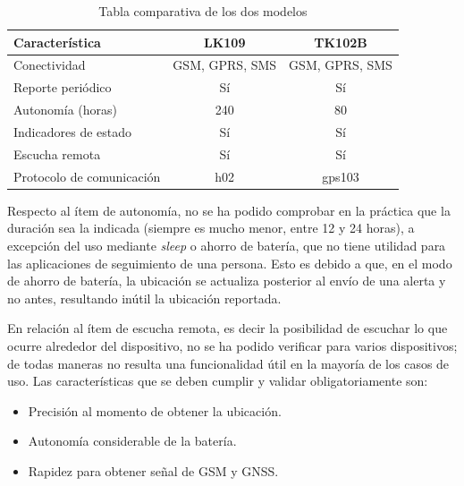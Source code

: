 \begin{table}[H]
	\centering
	\caption[Tabla comparativa]{Tabla comparativa de los dos modelos}
	\begin{tabular}{l c c}    
		\toprule
		\textbf{Característica} 	 & \textbf{LK109} & \textbf{TK102B}	  \\
		\midrule
		Conectividad & GSM, GPRS, SMS & 	GSM, GPRS, SMS			\\		
		Reporte periódico & Sí & Sí			\\
		Autonomía (horas) & 240 & 80		\\
		Indicadores de estado & Sí & Sí \\
		Escucha remota & Sí & Sí \\
		Protocolo de comunicación & h02 & gps103 \\
		\bottomrule
		\hline
	\end{tabular}
	\label{tab:peces}
\end{table}

Respecto al ítem de autonomía, no se ha podido comprobar en la práctica que la duración sea la indicada (siempre es mucho menor, entre 12 y 24 horas), a excepción del uso mediante \textit{sleep} o ahorro de batería, que no tiene utilidad para las aplicaciones de seguimiento de una persona. Esto es debido a que, en el modo de ahorro de batería, la ubicación se actualiza posterior al envío de una alerta y no antes, resultando inútil la ubicación reportada.

En relación al ítem de escucha remota, es decir la posibilidad de escuchar lo que ocurre alrededor del dispositivo, no se ha podido verificar para varios dispositivos; de todas maneras no resulta una funcionalidad útil en la mayoría de los casos de uso. Las características que se deben cumplir y validar obligatoriamente son:
\begin{itemize}
	\item Precisión al momento de obtener la ubicación.
	\item Autonomía considerable de la batería.
	\item Rapidez para obtener señal de GSM y GNSS.
\end{itemize}